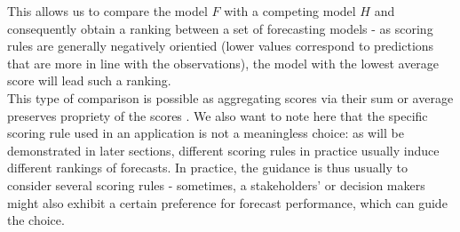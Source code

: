 This allows us to compare the model $F$ with a competing model $H$ and consequently obtain a ranking between a set of forecasting models - as scoring rules are generally negatively orientied (lower values correspond to predictions that are more in line with the observations), the model with the lowest average score will lead such a ranking.\\
This type of comparison is possible as aggregating scores via their sum or average preserves propriety of the scores \citep{bracher_evaluating_2021}.
We also want to note here that the specific scoring rule used in an application is not a meaningless choice: as will be demonstrated in later sections, different scoring rules in practice usually induce different rankings of forecasts. In practice, the guidance is thus usually to consider several scoring rules - sometimes, a stakeholders' or decision makers might also exhibit a certain preference for forecast performance, which can guide the choice.\\
